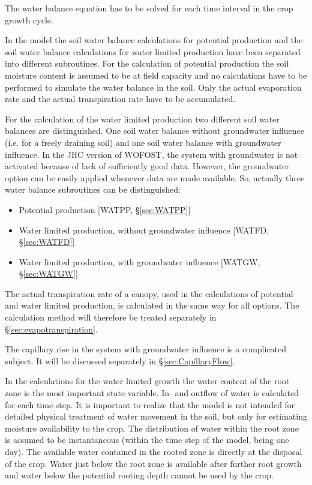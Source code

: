 The water balance equation has to be solved for each time interval in the crop growth cycle.

In the model the soil water balance calculations for potential production and the soil water
balance calculations for water limited production have been separated into different
subroutines. For the calculation of potential production the soil moisture content is
assumed to be at field capacity and no calculations have to be performed to simulate the
water balance in the soil. Only the actual evaporation rate and the actual transpiration rate
have to be accumulated. 

For the calculation of the water limited production two different soil water balances are
distinguished. One soil water balance without groundwater influence (i.e. for a freely
draining soil) and one soil water balance with groundwater influence. In the JRC version
of WOFOST, the system with groundwater is not activated because of lack of sufficiently
good data. However, the groundwater option can be easily applied whenever data are
made available. So, actually three water balance subroutines can be distinguished:
\begin{itemize}
\item Potential production [WATPP, \S \ref{sec:WATPP}]
\item Water limited production, without groundwater influence [WATFD, \S \ref{sec:WATFD}]
\item Water limited production, with groundwater influence [WATGW, \S \ref{sec:WATGW}]
\end{itemize}

The actual transpiration rate of a canopy, used in the calculations of potential and water
limited production, is calculated in the same way for all options. The calculation method
will therefore be treated separately in \S \ref{sec:evapotranspiration}. 

The capillary rise in the system with groundwater influence is a complicated subject. It
will be discussed separately in \S \ref{sec:CapillaryFlow}.

In the calculations for the water limited growth the water content of the root zone is the
most important state variable. In- and outflow of water is calculated for each time step. It
is important to realize that the model is not intended for detailed physical treatment of
water movement in the soil, but only for estimating moisture availability to the crop. The
distribution of water within the root zone is assumed to be instantaneous (within the time
step of the model, being one day). The available water contained in the rooted zone is
directly at the disposal of the crop. Water just below the root zone is available after
further root growth and water below the potential rooting depth cannot be used by the
crop.

